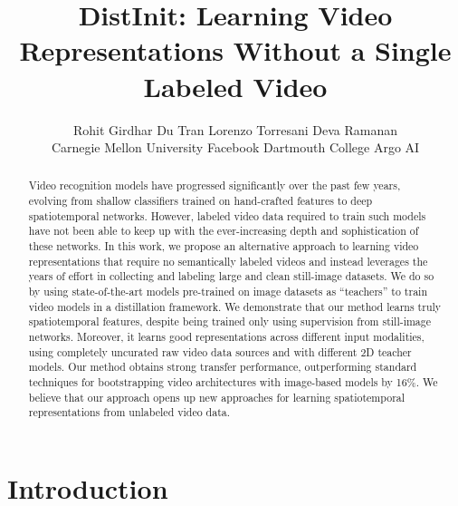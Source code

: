 \documentclass[10pt,twocolumn,letterpaper]{article}
\newcommand{\METHOD}[0]{DistInit}
\begin{document}
\title{\METHOD{}: Learning Video Representations Without a Single Labeled Video}

\author{
Rohit Girdhar \quad
Du Tran \quad
Lorenzo Torresani \quad
Deva Ramanan \\
Carnegie Mellon University \quad Facebook \quad Dartmouth College \quad Argo AI \\
}

\maketitle
\thispagestyle{empty}

\begin{abstract}

Video recognition models have progressed significantly over the past few years,
evolving from shallow classifiers trained on hand-crafted features to deep spatiotemporal
networks. 
However, labeled video data
required to train such models have not been able to keep up with the ever-increasing
depth and sophistication of these networks.
In this work, we propose an alternative approach to learning video representations that
require no semantically labeled videos and instead leverages the years of effort
in collecting and labeling large and clean still-image datasets.
We do so by using state-of-the-art models pre-trained on image datasets as ``teachers'' to train video
models in a distillation framework.
We demonstrate that our method learns truly spatiotemporal features, despite being trained only using supervision from
still-image networks. Moreover, it learns good representations across different
input modalities, using completely uncurated raw video data sources and with different
2D teacher models.
Our method obtains strong transfer performance, outperforming standard
techniques for bootstrapping video architectures with image-based models by 16\%. 
We believe that our approach opens up new approaches for learning spatiotemporal representations from unlabeled video data.
\end{abstract}
 \section{Introduction}\label{sec:intro}
\end{document}
